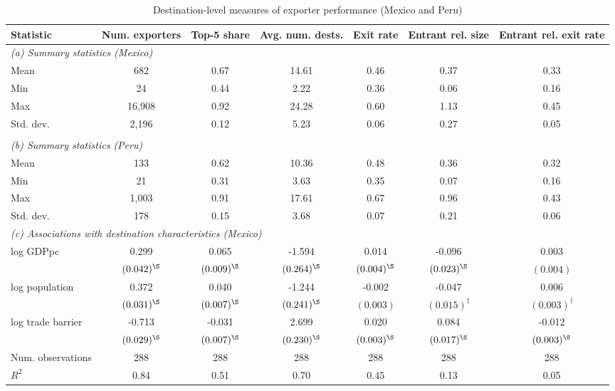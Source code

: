 \begin{table}[h!]
\begin{center}
\footnotesize
\renewcommand{\arraystretch}{1.2}
\caption{Destination-level measures of exporter performance (Mexico and Peru)}
\label{tab:sumstats_regs_wbedd}
\begin{tabular}{lcccccc}\toprule
Statistic& \multicolumn{1}{b{1.6cm}}{\centering Num. exporters}& \multicolumn{1}{b{1.6cm}}{\centering Top-5 share}& \multicolumn{1}{b{1.6cm}}{\centering Avg. num. dests.}& \multicolumn{1}{b{1.6cm}}{\centering Exit rate}& \multicolumn{1}{b{1.6cm}}{\centering Entrant rel. size}& \multicolumn{1}{b{1.6cm}}{\centering Entrant rel. exit rate}\\
\midrule
\multicolumn{7}{l}{\textit{(a) Summary statistics (Mexico)}}\\
Mean& 682& 0.67& 14.61& 0.46& 0.37& 0.33\\
Min& 24& 0.44& 2.22& 0.36& 0.06& 0.16\\
Max& 16,908& 0.92& 24.28& 0.60& 1.13& 0.45\\
Std. dev.& 2,196& 0.12& 5.23& 0.06& 0.27& 0.05\\
\\
\multicolumn{7}{l}{\textit{(b) Summary statistics (Peru)}}\\
Mean& 133& 0.62& 10.36& 0.48& 0.36& 0.32\\
Min& 21& 0.31& 3.63& 0.35& 0.07& 0.16\\
Max& 1,003& 0.91& 17.61& 0.67& 0.96& 0.43\\
Std. dev.& 178& 0.15& 3.68& 0.07& 0.21& 0.06\\
\midrule
\multicolumn{7}{l}{\textit{(c) Associations with destination characteristics (Mexico)}}\\[4pt]
log GDPpc& 0.299& 0.065& -1.594& 0.014& -0.096& 0.003\\
& $(0.042)^\S$& $(0.009)^\S$& $(0.264)^\S$& $(0.004)^\S$& $(0.023)^\S$& $(0.004)$\\[4pt]
log population& 0.372& 0.040& -1.244& -0.002& -0.047& 0.006\\
& $(0.031)^\S$& $(0.007)^\S$& $(0.241)^\S$& $(0.003)$& $(0.015)^\ddagger$& $(0.003)^\dagger$\\[4pt]
log trade barrier& -0.713& -0.031& 2.699& 0.020& 0.084& -0.012\\
& $(0.029)^\S$& $(0.007)^\S$& $(0.230)^\S$& $(0.003)^\S$& $(0.017)^\S$& $(0.003)^\S$\\[4pt]
Num. observations& 288& 288& 288& 288& 288& 288\\
$R^2$& 0.84& 0.51& 0.70& 0.45& 0.13& 0.05\\

\end{tabular}
\end{center}
\end{table}
